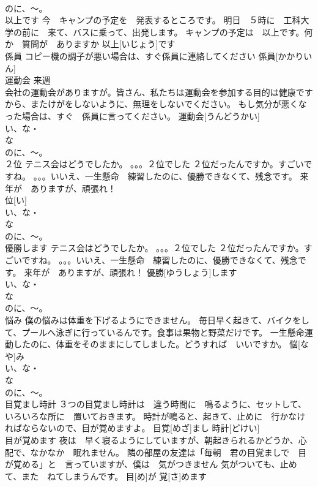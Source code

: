 \documentclass[8pt]{extreport}
\begin{document}
\begin{CJK}{UTF8}{min}
\\	のに、～。
\\	以上です	今　キャンプの予定を　発表するところです。 明日　５時に　工科大学の前に　来て、バスに乗って、出発します。 キャンプの予定は　以上です。何か　質問が　ありますか	以上[いじょう]です					
\\	係員	コピー機の調子が悪い場合は、すぐ係員に連絡してください	係員[かかりいん]			
\\	運動会	来週
\\	会社の運動会がありますが。皆さん、私たちは運動会を参加する目的は健康ですから、またけがをしないように、無理をしないでください。 もし気分が悪くなった場合は、すぐ　係員に言ってください。	運動会[うんどうかい]				
\\	い、な・
\\	な
\\	のに、～。
\\	２位	テニス会はどうでしたか。 。。。２位でした ２位だったんですか。すごいですね。 。。。いいえ、一生懸命　練習したのに、優勝できなくて、残念です。 来年が　ありますが、頑張れ！	
\\	位[い]				
\\	い、な・
\\	な
\\	のに、～。
\\	優勝します	テニス会はどうでしたか。 。。。２位でした ２位だったんですか。すごいですね。 。。。いいえ、一生懸命　練習したのに、優勝できなくて、残念です。 来年が　ありますが、頑張れ！	優勝[ゆうしょう]します				
\\	い、な・
\\	な
\\	のに、～。
\\	悩み	僕の悩みは体重を下げるようにできません。 毎日早く起きて、バイクをして、プールへ泳ぎに行っているんです。食事は果物と野菜だけです。 一生懸命運動したのに、体重をそのままにしてしました。どうすれば　いいですか。	悩[なや]み			
\\	い、な・
\\	な
\\	のに、～。
\\	目覚まし時計	３つの目覚まし時計は　違う時間に　鳴るように、セットして、いろいろな所に　置いておきます。 時計が鳴ると、起きて、止めに　行かなければならないので、目が覚めますよ。	目覚[めざ]まし 時計[どけい]					
\\	目が覚めます	夜は　早く寝るようにしていますが、朝起きられるかどうか、心配で、なかなか　眠れません。 隣の部屋の友達は「毎朝　君の目覚ましで　目が覚める」と　言っていますが、僕は　気がつきません 気がついても、止めて、また　ねてしまうんです。	目[め]が 覚[さ]めます					

\end{CJK}
\end{document}
